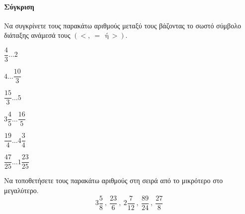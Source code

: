 \documentclass[11pt,a4paper,modern]{FFExercises}
\begin{document}
\paragraph{Σύγκριση}
\askhsh
Να συγκρίνετε τους παρακάτω αριθμούς μεταξύ τους βάζοντας το σωστό σύμβολο διάταξης ανάμεσά τους $ (<,\ =\ \ \textrm{ή}\ >) $.
\begin{multicols}{3}
\begin{alist}
\item $ \dfrac{4}{3}\ldots 2 $
\item $ 4\ldots \dfrac{10}{3} $
\item $ \dfrac{15}{3}\ldots 5 $
\item $ 3\dfrac{4}{5}\ldots \dfrac{16}{5} $
\item $ \dfrac{19}{4}\ldots 4\dfrac{3}{4} $
\item $ \dfrac{47}{25}\ldots 1\dfrac{23}{25} $
\end{alist}
\end{multicols}
\askhsh
Να τοποθετήσετε τους παρακάτω αριθμούς στη σειρά από το μικρότερο στο μεγαλύτερο.
\[ 3\frac{5}{8}\ ,\ \frac{23}{6}\ ,\ 2\frac{7}{12}\ ,\ \frac{89}{24}\ ,\ \dfrac{27}{8} \]
\end{document}
